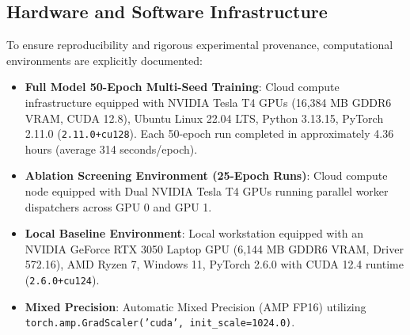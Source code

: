 \documentclass[journal]{IEEEtran}
\begin{document}
\subsection{Hardware and Software Infrastructure}
To ensure reproducibility and rigorous experimental provenance, computational environments are explicitly documented:
\begin{itemize}
    \item \textbf{Full Model 50-Epoch Multi-Seed Training}: Cloud compute infrastructure equipped with NVIDIA Tesla T4 GPUs (16,384 MB GDDR6 VRAM, CUDA 12.8), Ubuntu Linux 22.04 LTS, Python 3.13.15, PyTorch 2.11.0 (\texttt{2.11.0+cu128}). Each 50-epoch run completed in approximately 4.36 hours (average 314 seconds/epoch).
    \item \textbf{Ablation Screening Environment (25-Epoch Runs)}: Cloud compute node equipped with Dual NVIDIA Tesla T4 GPUs running parallel worker dispatchers across GPU 0 and GPU 1.
    \item \textbf{Local Baseline Environment}: Local workstation equipped with an NVIDIA GeForce RTX 3050 Laptop GPU (6,144 MB GDDR6 VRAM, Driver 572.16), AMD Ryzen 7, Windows 11, PyTorch 2.6.0 with CUDA 12.4 runtime (\texttt{2.6.0+cu124}).
    \item \textbf{Mixed Precision}: Automatic Mixed Precision (AMP FP16) utilizing \texttt{torch.amp.GradScaler('cuda', init\_scale=1024.0)}.
\end{itemize}
\end{document}
